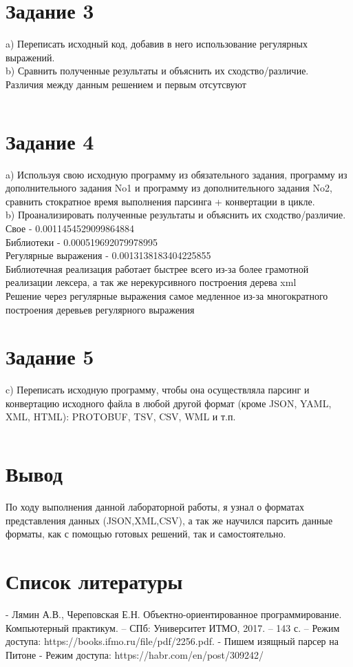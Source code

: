 \documentclass[12pt,onecolumn]{article}
\begin{document}
\section{Задание 3}
a) Переписать исходный код, добавив в него использование регулярных выражений. \\
b) Сравнить полученные результаты и объяснить их сходство/различие. \\
Различия между данным решением и первым отсутсвуют \\
\inputminted{python}{trash/2}
\newpage 
\section{Задание 4}
a) Используя свою исходную программу из обязательного задания, программу из дополнительного задания No1 и программу из дополнительного задания No2, сравнить стократное время выполнения парсинга + конвертации в цикле. \\
b) Проанализировать полученные результаты и объяснить их сходство/различие. \\
Свое - 0.0011454529099864884 \\
Библиотеки - 0.000519692079978995 \\
Регулярные выражения - 0.0013138183404225855 \\
Библиотечная реализация работает быстрее всего из-за более грамотной реализации лексера, а так же нерекурсивного построения дерева xml \\
Решение через регулярные выражения самое медленное из-за многократного построения деревьев регулярного выражения
\newpage 
\section{Задание 5}
c) Переписать исходную программу, чтобы она осуществляла парсинг и конвертацию исходного файла в любой другой формат (кроме JSON, YAML, XML, HTML): PROTOBUF, TSV, CSV, WML и т.п. \\
\inputminted{python}{trash/3}
\newpage 
\section{Вывод}
По ходу выполнения данной лабораторной работы, я узнал о форматах представления данных (JSON,XML,CSV), а так же научился парсить данные форматы, как с помощью готовых решений, так и самостоятельно. 
\newpage 
\section{Список литературы}
- Лямин А.В., Череповская Е.Н. Объектно-ориентированное программирование. Компьютерный практикум. – СПб: Университет ИТМО, 2017. – 143 с. – Режим доступа: https://books.ifmo.ru/file/pdf/2256.pdf.
- Пишем изящный парсер на Питоне - Режим доступа: https://habr.com/en/post/309242/
\end{document}
